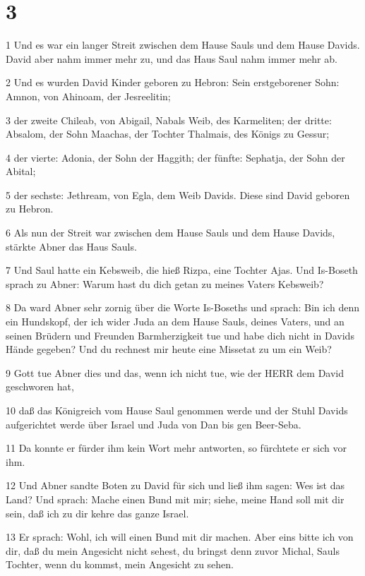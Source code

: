 \chapter{3}

\par 1 Und es war ein langer Streit zwischen dem Hause Sauls und dem Hause Davids. David aber nahm immer mehr zu, und das Haus Saul nahm immer mehr ab.
\par 2 Und es wurden David Kinder geboren zu Hebron: Sein erstgeborener Sohn: Amnon, von Ahinoam, der Jesreelitin;
\par 3 der zweite Chileab, von Abigail, Nabals Weib, des Karmeliten; der dritte: Absalom, der Sohn Maachas, der Tochter Thalmais, des Königs zu Gessur;
\par 4 der vierte: Adonia, der Sohn der Haggith; der fünfte: Sephatja, der Sohn der Abital;
\par 5 der sechste: Jethream, von Egla, dem Weib Davids. Diese sind David geboren zu Hebron.
\par 6 Als nun der Streit war zwischen dem Hause Sauls und dem Hause Davids, stärkte Abner das Haus Sauls.
\par 7 Und Saul hatte ein Kebsweib, die hieß Rizpa, eine Tochter Ajas. Und Is-Boseth sprach zu Abner: Warum hast du dich getan zu meines Vaters Kebsweib?
\par 8 Da ward Abner sehr zornig über die Worte Is-Boseths und sprach: Bin ich denn ein Hundskopf, der ich wider Juda an dem Hause Sauls, deines Vaters, und an seinen Brüdern und Freunden Barmherzigkeit tue und habe dich nicht in Davids Hände gegeben? Und du rechnest mir heute eine Missetat zu um ein Weib?
\par 9 Gott tue Abner dies und das, wenn ich nicht tue, wie der HERR dem David geschworen hat,
\par 10 daß das Königreich vom Hause Saul genommen werde und der Stuhl Davids aufgerichtet werde über Israel und Juda von Dan bis gen Beer-Seba.
\par 11 Da konnte er fürder ihm kein Wort mehr antworten, so fürchtete er sich vor ihm.
\par 12 Und Abner sandte Boten zu David für sich und ließ ihm sagen: Wes ist das Land? Und sprach: Mache einen Bund mit mir; siehe, meine Hand soll mit dir sein, daß ich zu dir kehre das ganze Israel.
\par 13 Er sprach: Wohl, ich will einen Bund mit dir machen. Aber eins bitte ich von dir, daß du mein Angesicht nicht sehest, du bringst denn zuvor Michal, Sauls Tochter, wenn du kommst, mein Angesicht zu sehen.
